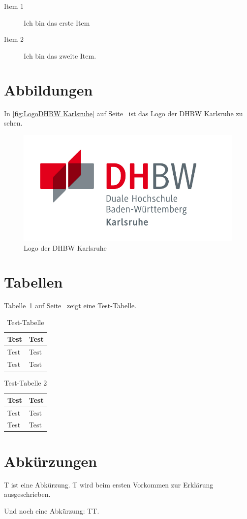 \begin{description}
	\item[Item 1]
		Ich bin das erste Item
	\item[Item 2]
		Ich bin das zweite Item.
\end{description}

\section{Abbildungen}

In \autoref{fig:LogoDHBW Karlsruhe} auf Seite~\pageref{fig:LogoDHBW Karlsruhe} ist das Logo der DHBW Karlsruhe zu sehen.

\begin{figure}[!htbp]
	\centering
	\includegraphics[scale=0.75]{Abbildungen/Logo_DHBW_Karlsruhe.png}
	\caption{Logo der DHBW Karlsruhe}
	\label{fig:LogoDHBW Karlsruhe}
\end{figure}

\section{Tabellen}

Tabelle~\ref{tbl:TestTabelle} auf Seite~\pageref{tbl:TestTabelle} zeigt eine Test-Tabelle.

\begin{table}[!htbp]
	\centering
	\begin{tabular}{ll}
		\textbf{Test}	& \textbf{Test}\\
		\hline
		Test 	&	Test\\
		Test 	&	Test\\
		\hline
	\end{tabular}
	\caption{Test-Tabelle}
	\label{tbl:TestTabelle}
\end{table}

\begin{table}[!htbp]
	\centering
	\begin{tabular}{ll}
		\textbf{Test}	& \textbf{Test}\\
		\hline
		Test 	&	Test\\
		Test 	&	Test\\
		\hline
	\end{tabular}
	\caption{Test-Tabelle 2}
	\label{tbl:TestTabelle2}
\end{table}

\section{Abkürzungen}

\ac{T} ist eine Abkürzung.
\ac{T} wird beim ersten Vorkommen zur Erklärung ausgeschrieben.

Und noch eine Abkürzung: \ac{TT}.